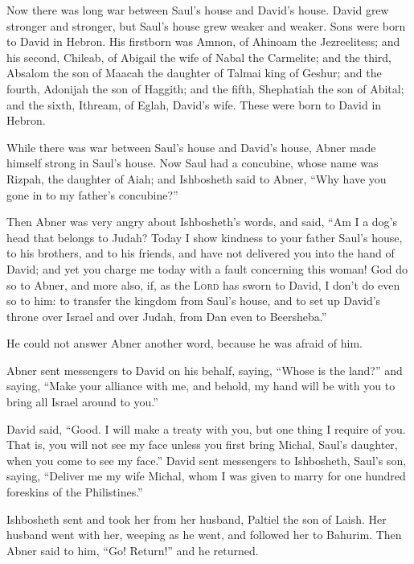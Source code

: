  Now there was long war between Saul's house and David's
house. David grew stronger and stronger, but Saul's house grew weaker
and weaker.  Sons were born to David in Hebron. His
firstborn was Amnon, of Ahinoam the Jezreelitess;  and his
second, Chileab, of Abigail the wife of Nabal the Carmelite; and the
third, Absalom the son of Maacah the daughter of Talmai king of Geshur;
 and the fourth, Adonijah the son of Haggith; and the
fifth, Shephatiah the son of Abital;  and the sixth,
Ithream, of Eglah, David's wife. These were born to David in Hebron.

 While there was war between Saul's house and David's
house, Abner made himself strong in Saul's house.  Now
Saul had a concubine, whose name was Rizpah, the daughter of Aiah; and
Ishbosheth said to Abner, ``Why have you gone in to my father's
concubine?''

 Then Abner was very angry about Ishbosheth's words, and
said, ``Am I a dog's head that belongs to Judah? Today I show kindness
to your father Saul's house, to his brothers, and to his friends, and
have not delivered you into the hand of David; and yet you charge me
today with a fault concerning this woman!  God do so to
Abner, and more also, if, as the \textsc{Lord} has sworn to David, I
don't do even so to him:  to transfer the kingdom from
Saul's house, and to set up David's throne over Israel and over Judah,
from Dan even to Beersheba.''

 He could not answer Abner another word, because he was
afraid of him.

 Abner sent messengers to David on his behalf, saying,
``Whose is the land?'' and saying, ``Make your alliance with me, and
behold, my hand will be with you to bring all Israel around to you.''

 David said, ``Good. I will make a treaty with you, but
one thing I require of you. That is, you will not see my face unless you
first bring Michal, Saul's daughter, when you come to see my face.''
 David sent messengers to Ishbosheth, Saul's son, saying,
``Deliver me my wife Michal, whom I was given to marry for one hundred
foreskins of the Philistines.''

 Ishbosheth sent and took her from her husband, Paltiel
the son of Laish.  Her husband went with her, weeping as
he went, and followed her to Bahurim. Then Abner said to him, ``Go!
Return!'' and he returned.

